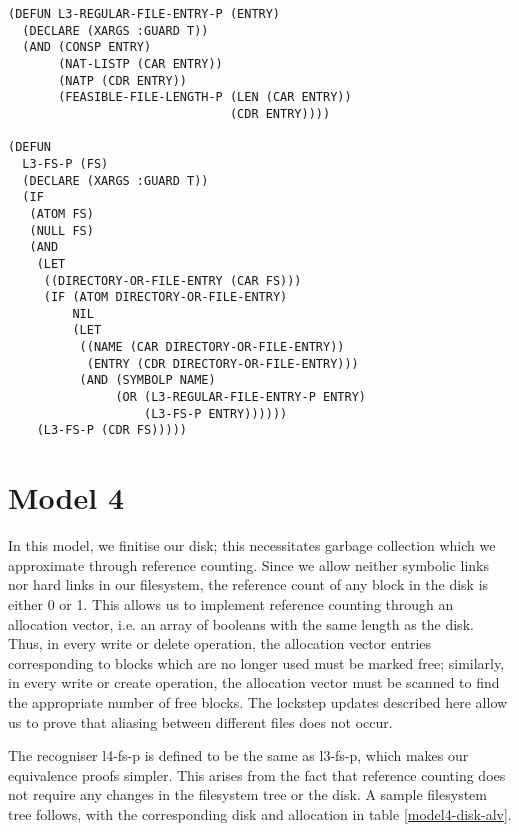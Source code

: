 \documentclass[format=sigconf,review=true]{acmart}
\begin{document}
\begin{lstlisting}
(DEFUN L3-REGULAR-FILE-ENTRY-P (ENTRY)
  (DECLARE (XARGS :GUARD T))
  (AND (CONSP ENTRY)
       (NAT-LISTP (CAR ENTRY))
       (NATP (CDR ENTRY))
       (FEASIBLE-FILE-LENGTH-P (LEN (CAR ENTRY))
                               (CDR ENTRY))))

(DEFUN
  L3-FS-P (FS)
  (DECLARE (XARGS :GUARD T))
  (IF
   (ATOM FS)
   (NULL FS)
   (AND
    (LET
     ((DIRECTORY-OR-FILE-ENTRY (CAR FS)))
     (IF (ATOM DIRECTORY-OR-FILE-ENTRY)
         NIL
         (LET
          ((NAME (CAR DIRECTORY-OR-FILE-ENTRY))
           (ENTRY (CDR DIRECTORY-OR-FILE-ENTRY)))
          (AND (SYMBOLP NAME)
               (OR (L3-REGULAR-FILE-ENTRY-P ENTRY)
                   (L3-FS-P ENTRY))))))
    (L3-FS-P (CDR FS)))))
\end{lstlisting}

\section{Model 4}
In this model, we finitise our disk; this necessitates garbage
collection which we approximate through reference
counting. Since we allow neither symbolic links nor hard links in our
filesystem, the reference count of any block in the disk is either 0
or 1. This allows us to implement reference counting through an
allocation vector, i.e. an array of booleans with the same length as
the disk. Thus, in every write or delete operation, the allocation
vector entries corresponding to blocks which are no longer used must
be marked free; similarly, in every write or create operation, the
allocation vector must be scanned to find the appropriate number of
free blocks. The lockstep updates described here allow us to prove
that aliasing between different files does not occur.

The recogniser l4-fs-p is defined to be the same as l3-fs-p, which
makes our equivalence proofs simpler. This arises from the fact that
reference counting does not require any changes in the filesystem tree
or the disk. A sample filesystem tree follows, with the corresponding
disk and allocation in table \ref{model4-disk-alv}.
\end{document}
